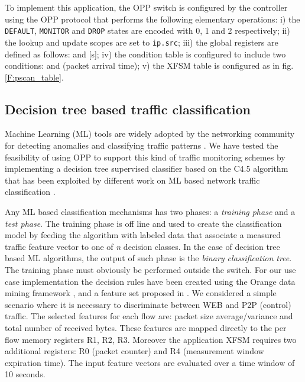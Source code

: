 \documentclass{sig-alternate}
\begin{document}
To implement this application, the OPP switch is configured by the controller using the OPP protocol that performs the following elementary operations: i) the \texttt{DEFAULT},  \texttt{MONITOR} and  \texttt{DROP} states are encoded with 0, 1 and 2 respectively; ii) the lookup and update scopes are set to \texttt{ip.src}; iii) the global registers are defined as follows:  and [s]; iv) the condition table is configured to include two conditions:  and  (packet arrival time); v) the XFSM table is configured as in fig. \ref{F:pscan_table}.

\subsection{Decision tree based traffic classification}
Machine Learning (ML) tools are widely adopted by the networking  community for detecting anomalies and classifying traffic patterns \cite{nguyen2008survey}. We have tested the feasibility of using OPP to support this kind of traffic monitoring schemes by implementing a decision tree supervised classifier based on the C4.5 algorithm \cite{quinlan2014c4} that has been exploited by different work on ML based network traffic classification \cite{williams2006preliminary,pan2003hybrid,ma2008study,zhang2010method,li2007machine,alshammari2009machine}.

Any ML based classification mechanisms has two phases: a {\em training phase} and a {\em test phase}. The training phase is off line and used to create the classification model by feeding the algorithm with labeled data that associate a measured traffic feature vector to one of {\em n} decision classes. In the case of decision tree based ML algorithms, the output of such phase is the {\em binary classification tree}. The training phase must obviously be performed outside the switch. For our use case implementation the decision rules have been created using the Orange data mining framework \cite{JMLR:demsar13a}, and a feature set proposed in  \cite{li2007accurate}. We considered a simple scenario where it is necessary to discriminate between WEB and P2P (control) traffic. The selected features for each flow are: packet size average/variance and total number of received bytes. These features are mapped directly to the per flow memory registers R1, R2, R3. Moreover the application XFSM requires two additional registers: R0 (packet counter) and R4 (measurement window expiration time). The input feature vectors are evaluated over a time window of 10 seconds.
\end{document}
